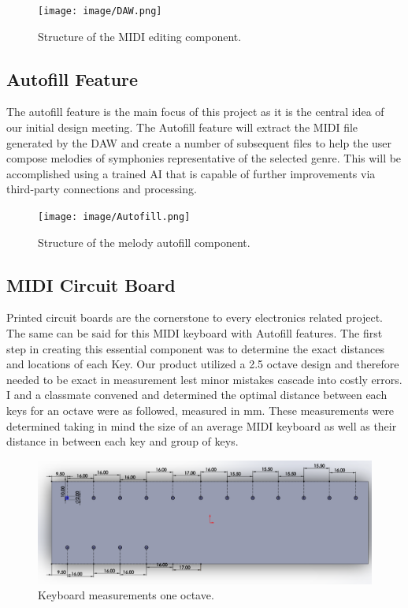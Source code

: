 \begin{figure}[h!]
  \centering
  \texttt{[image: image/DAW.png]}
  \caption{Structure of the MIDI editing component.}
  \label{fig:daw_diagram}
\end{figure}

\newpage
\subsection{Autofill Feature}

The autofill feature is the main focus of this project as it is the central idea of our
initial design meeting. The Autofill feature will extract the MIDI file generated by the
DAW and create a number of subsequent files to help the user compose melodies of
symphonies representative of the selected genre. This will be accomplished using a trained
AI that is capable of further improvements via third-party connections and processing.

\begin{figure}[h!]
  \centering
  \texttt{[image: image/Autofill.png]}
  \caption{Structure of the melody autofill component.}
  \label{fig:autofill_diagram}
\end{figure}
\clearpage

\subsection{MIDI Circuit Board}

Printed circuit boards are the cornerstone to every electronics related project.
The same can be said for this MIDI keyboard with Autofill features. The first
step in creating this essential component was to determine the exact distances
and locations of each Key. Our product utilized a 2.5 octave design and
therefore needed to be exact in measurement lest minor mistakes cascade into
costly errors. I and a classmate convened and determined the optimal distance
between each keys for an octave were as followed, measured in mm. These
measurements were determined taking in mind the size of an average MIDI keyboard
as well as their distance in between each key and group of keys.

\begin{figure}[h!]
  \centering
  \includegraphics[width=\linewidth]{image/pcbdesign.png}
  \caption{Keyboard measurements one octave.}
  \label{fig:pcb_design_diagram}
\end{figure}

